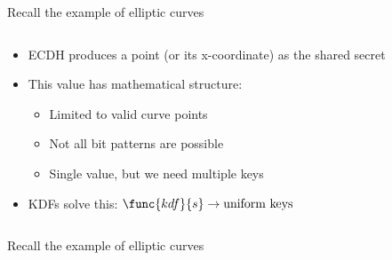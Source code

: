 \documentclass[aspectratio=169, lualatex, handout]{beamer}
\begin{document}
\begin{frame}{Recall the example of elliptic curves}
	\begin{columns}[c]
		\begin{column}{0.5\textwidth}
			\begin{itemize}
				\item ECDH produces a point (or its x-coordinate) as the shared secret
				\item This value has mathematical structure:
				      \begin{itemize}
					      \item Limited to valid curve points
					      \item Not all bit patterns are possible
					      \item Single value, but we need multiple keys
				      \end{itemize}
				\item KDFs solve this: $\func{kdf}{s} \rightarrow \text{uniform keys}$
			\end{itemize}
		\end{column}
		\begin{column}{0.5\textwidth}
		\end{column}
	\end{columns}
\end{frame}

\begin{frame}{Recall the example of elliptic curves}
	\begin{columns}[c]
		\begin{column}{0.5\textwidth}
			\begin{center}
			\end{center}
		\end{column}
		\begin{column}{0.5\textwidth}
		\end{column}
	\end{columns}
\end{frame}
\end{document}
